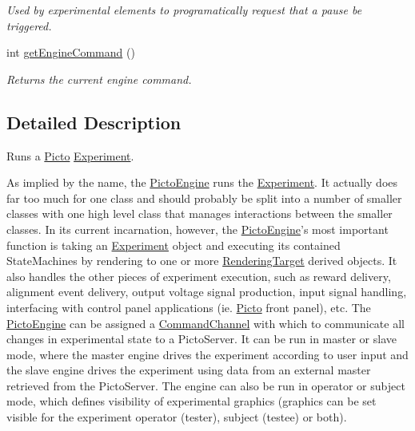 \begin{DoxyCompactItemize}
\begin{DoxyCompactList}\small\item\em Used by experimental elements to programatically request that a pause be triggered. \end{DoxyCompactList}\item 
int \hyperlink{class_picto_1_1_engine_1_1_picto_engine_acd4ee87ea24bdb2ead7aa47438251bed}{get\-Engine\-Command} ()
\begin{DoxyCompactList}\small\item\em Returns the current engine command. \end{DoxyCompactList}\end{DoxyCompactItemize}


\subsection{Detailed Description}
Runs a \hyperlink{namespace_picto}{Picto} \hyperlink{class_picto_1_1_experiment}{Experiment}. 

As implied by the name, the \hyperlink{class_picto_1_1_engine_1_1_picto_engine}{Picto\-Engine} runs the \hyperlink{class_picto_1_1_experiment}{Experiment}. It actually does far too much for one class and should probably be split into a number of smaller classes with one high level class that manages interactions between the smaller classes. In its current incarnation, however, the \hyperlink{class_picto_1_1_engine_1_1_picto_engine}{Picto\-Engine}'s most important function is taking an \hyperlink{class_picto_1_1_experiment}{Experiment} object and executing its contained State\-Machines by rendering to one or more \hyperlink{struct_picto_1_1_rendering_target}{Rendering\-Target} derived objects. It also handles the other pieces of experiment execution, such as reward delivery, alignment event delivery, output voltage signal production, input signal handling, interfacing with control panel applications (ie. \hyperlink{namespace_picto}{Picto} front panel), etc. The \hyperlink{class_picto_1_1_engine_1_1_picto_engine}{Picto\-Engine} can be assigned a \hyperlink{class_picto_1_1_command_channel}{Command\-Channel} with which to communicate all changes in experimental state to a Picto\-Server. It can be run in master or slave mode, where the master engine drives the experiment according to user input and the slave engine drives the experiment using data from an external master retrieved from the Picto\-Server. The engine can also be run in operator or subject mode, which defines visibility of experimental graphics (graphics can be set visible for the experiment operator (tester), subject (testee) or both).

